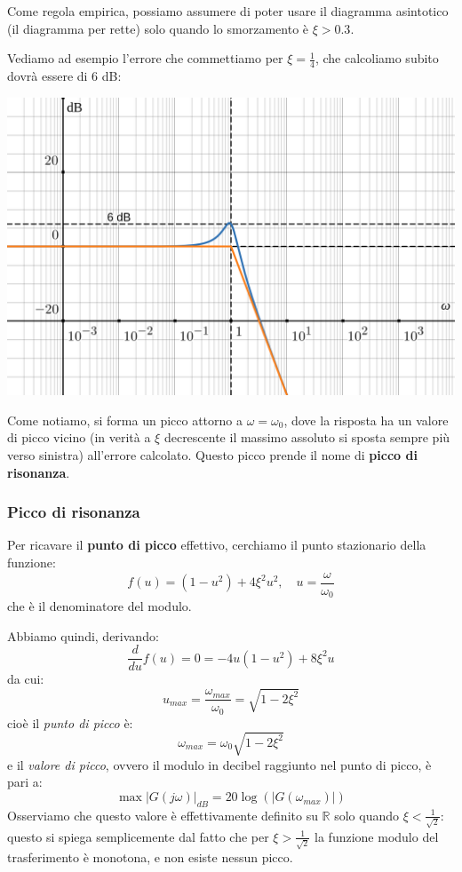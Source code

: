 \documentclass[a4paper,11pt]{article}
\begin{document}
Come regola empirica, possiamo assumere di poter usare il diagramma asintotico (il diagramma per rette) solo quando lo smorzamento è $\xi > 0.3$.

\par\bigskip

\noindent
\begin{minipage}{\textwidth}
Vediamo ad esempio l'errore che commettiamo per $\xi = \frac{1}{4}$, che calcoliamo subito dovrà essere di 6 dB:

\begin{center}
	\includegraphics[scale=0.3]{../figures/order2_bode/reso_025_mod.png}
\end{center}
\end{minipage}

\par\bigskip

Come notiamo, si forma un picco attorno a $\omega = \omega_0$, dove la risposta ha un valore di picco vicino (in verità a $\xi$ decrescente il massimo assoluto si sposta sempre più verso sinistra) all'errore calcolato.
Questo picco prende il nome di \textbf{picco di risonanza}.

\subsubsection{Picco di risonanza}
Per ricavare il \textbf{punto di picco} effettivo, cerchiamo il punto stazionario della funzione:
$$
f(u) = (1 - u^2) + 4 \xi^2 u^2, \quad u= \frac{\omega}{\omega_0}
$$
che è il denominatore del modulo.

Abbiamo quindi, derivando:
$$
\frac{d}{du} f(u) = 0 = -4u(1 - u^2) + 8 \xi^2 u
$$
da cui:
$$
u_{max} = \frac{\omega_{max}}{\omega_0} = \sqrt{1 - 2 \xi^2}
$$
cioè il \textit{punto di picco} è:
$$
\omega_{max} = \omega_0 \sqrt{1 - 2 \xi^2} 
$$
e il \textit{valore di picco}, ovvero il modulo in decibel raggiunto nel punto di picco, è pari a:
$$
\max |G(j \omega)|_{dB} = 20 \log \left( |G(\omega_{max})| \right)
$$
Osserviamo che questo valore è effettivamente definito su $\mathbb{R}$ solo quando $\xi < \frac{1}{\sqrt{2}}$: questo si spiega semplicemente dal fatto che per $\xi > \frac{1}{\sqrt{2}}$ la funzione modulo del trasferimento è monotona, e non esiste nessun picco.
\end{document}
